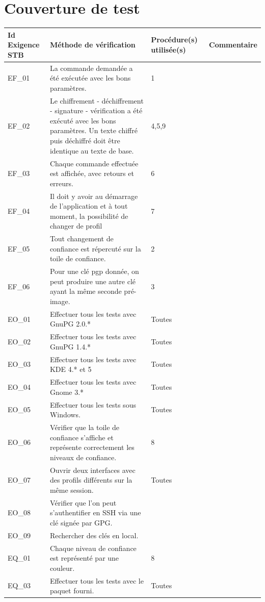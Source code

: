 \documentclass{../res/univ-projet}
\begin{document}
\section{Couverture de test}

\begin{center}
    \begin{tabular}{|p{2.8cm}|p{4.2cm}|p{3cm}|p{5cm}|}
      \hline
      Id Exigence STB & Méthode de vérification & Procédure(s) utilisée(s) & Commentaire\\ \hline
      EF\_01 & La commande demandée a été exécutée avec les bons paramètres. & 1 & \\ \hline
      EF\_02 & Le chiffrement - déchiffrement - signature - vérification a été exécuté avec les bons paramètres. Un texte chiffré puis déchiffré doit être identique au texte de base. & 4,5,9 & \\ \hline
      EF\_03 & Chaque commande effectuée est affichée, avec retours et erreurs. & 6 & \\ \hline
      EF\_04 & Il doit y avoir au démarrage de l'application et à tout moment, la possibilité de changer de profil & 7 & \\ \hline
      EF\_05 & Tout changement de confiance est répercuté sur la toile de confiance. & 2 & \\ \hline
      EF\_06 & Pour une clé pgp donnée, on peut produire une autre clé ayant la même seconde pré-image. & 3 & \\ \hline
      EO\_01 & Effectuer tous les tests avec GnuPG 2.0.* & Toutes & \\ \hline
      EO\_02 & Effectuer tous les tests avec GnuPG 1.4.* & Toutes & \\ \hline
      EO\_03 & Effectuer tous les tests avec KDE 4.* et 5 & Toutes & \\ \hline
      EO\_04 & Effectuer tous les tests avec Gnome 3.* & Toutes & \\ \hline
      EO\_05 & Effectuer tous les tests sous Windows. & Toutes & \\ \hline
      EO\_06 & Vérifier que la toile de confiance s'affiche et représente correctement les niveaux de confiance. & 8 & \\ \hline
      EO\_07 & Ouvrir deux interfaces avec des profils différents sur la même session. & Toutes & \\ \hline
      EO\_08 & Vérifier que l'on peut s'authentifier en SSH via une clé signée par GPG. &  & \\ \hline
      EO\_09 & Rechercher des clés en local. &  & \\ \hline
      EQ\_01 & Chaque niveau de confiance est représenté par une couleur. & 8 & \\ \hline
      EQ\_03 & Effectuer tous les tests avec le paquet fourni. & Toutes & \\ \hline
  \end{tabular}  
\end{center}
\end{document}

